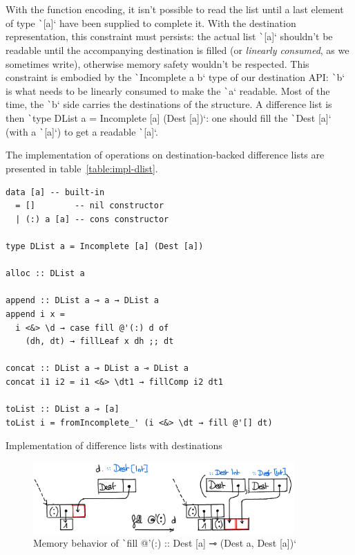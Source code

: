 \documentclass[english]{jflart}
\begin{document}
With the function encoding, it isn't possible to read the list until a last element of type \texttt`[a]` have been supplied to complete it. With the destination representation, this constraint must persists: the actual list \texttt`[a]` shouldn't be readable until the accompanying destination is filled (or \emph{linearly consumed}, as we sometimes write), otherwise memory safety wouldn't be respected. This constraint is embodied by the \texttt`Incomplete a b` type of our destination API: \texttt`b` is what needs to be linearly consumed to make the \texttt`a` readable. Most of the time, the \texttt`b` side carries the destinations of the structure. A difference list is then \texttt`type DList a = Incomplete [a] (Dest [a])`: one should fill the \texttt`Dest [a]` (with a \texttt`[a]`) to get a readable \texttt`[a]`.

The implementation of operations on destination-backed difference lists are presented in table~\ref{table:impl-dlist}.
\begin{table}[t]
\small
\begin{verbatim}
data [a] -- built-in
  = []        -- nil constructor
  | (:) a [a] -- cons constructor

type DList a = Incomplete [a] (Dest [a])

alloc :: DList a

append :: DList a ⊸ a → DList a
append i x =
  i <&> \d → case fill @'(:) d of
    (dh, dt) → fillLeaf x dh ;; dt

concat :: DList a ⊸ DList a ⊸ DList a
concat i1 i2 = i1 <&> \dt1 → fillComp i2 dt1

toList :: DList a ⊸ [a]
toList i = fromIncomplete_' (i <&> \dt → fill @'[] dt)
\end{verbatim}
\caption{Implementation of difference lists with destinations}
\label{table:impl-dlist}
\end{table}

\begin{figure}[t]\centering
  \includegraphics[width=10cm]{fillCons.png}
  \caption{Memory behavior of \texttt`fill @'(:) :: Dest [a] ⊸ (Dest a, Dest [a])`}
  \label{fig:schema-fillCons}
\end{figure}
\end{document}

